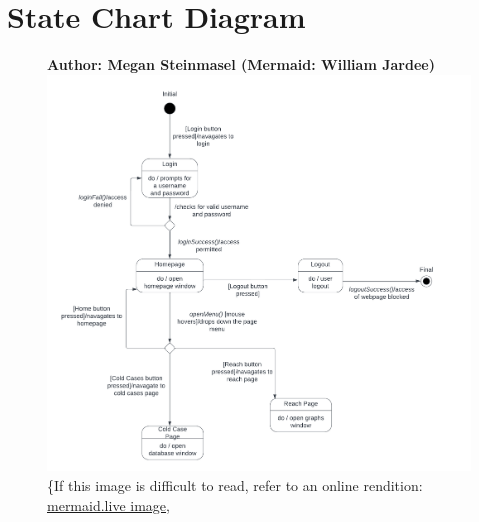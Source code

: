 \documentclass[11pt]{article}
\begin{document}
\section*{State Chart Diagram}

\begin{figure}[!ht]
\centering
\textbf{Author: Megan Steinmasel (Mermaid: William Jardee)}
	\includegraphics[width=.95\textwidth]{./State Chart/C.C. Statechart}\\
	\{If this image is difficult to read, refer to an online rendition: \href{https://mermaid.ink/img/pako:eNqlVU1vGjEQ_SuWT21EIEBLkr2RD_WSVmrph1TtZVgPu5a8NrK9IBTx3zu2ybJ85VJO3nl-b55nPOaVF0Ygz3ihwLknCaWFOteMfk_g4QEcspwPc86ur3eL2cZ5rKeilpplzKOlBXh0zEXgAtnQ6qbfv6KPgP2WrgFFfIveSlwRXZDInvysS6kRbRBItKQx3AlE8YwVFmNuIsOcQkmga7Hrfp-_lc-YQy0cU6bcJ9-5ax132X9w7qTHXy6S3_JT2ZbV--6vjqjr9MWa8FmADhaY1LlOMrEhHTevKczYtavM-kvI5z58zNjKSHEA_YS5wlPordBBMYD1Zvb9JaHb44yhuPt8MyLqkjVWHYesWR-HCqOauj0ExUGIH2Z96geF9AScxGn_Y9Qg5ITQIoccgQo9nlNLyAUaNY4UtcbCSxPhB2MUgj5Tls6VOq0MdVBDjcfxJRHXxu4TSr0CJcX0MeT7ZrxcbM6Y2g1Uyvi-q-5da21dNnbZWjRHu_3b9eh6aut4AXQerL9gN25IU_JiyjPkVIZY2EP04KCd0fnfc9pGTzWojZPujJ04yO_gNKRSnz8lQabxpw3jPV5TU0EKemej-5z7Cskuz2gpcAGN8jnPddjaLMND-EyX3VieLUA57HFovJltdNEG0q7de91GlQGBxHrlfrMMr3opnSfNwuiFLEOchpjClfdLlw0GAe6X0lfNvF-YeuCkqKiV1ep-MpiMJncwGuPkdgyfx2NRzIf3d4vRp-FC3N4MR8C32x5fgv5rDBnwtqH8GF1_3f2jpKTbf11N_Pk?type=png)](https://mermaid.live/edit#pako:eNqlVU1vGjEQ_SuWT21EIEBLkr2RD_WSVmrph1TtZVgPu5a8NrK9IBTx3zu2ybJ85VJO3nl-b55nPOaVF0Ygz3ihwLknCaWFOteMfk_g4QEcspwPc86ur3eL2cZ5rKeilpplzKOlBXh0zEXgAtnQ6qbfv6KPgP2WrgFFfIveSlwRXZDInvysS6kRbRBItKQx3AlE8YwVFmNuIsOcQkmga7Hrfp-_lc-YQy0cU6bcJ9-5ax132X9w7qTHXy6S3_JT2ZbV--6vjqjr9MWa8FmADhaY1LlOMrEhHTevKczYtavM-kvI5z58zNjKSHEA_YS5wlPordBBMYD1Zvb9JaHb44yhuPt8MyLqkjVWHYesWR-HCqOauj0ExUGIH2Z96geF9AScxGn_Y9Qg5ITQIoccgQo9nlNLyAUaNY4UtcbCSxPhB2MUgj5Tls6VOq0MdVBDjcfxJRHXxu4TSr0CJcX0MeT7ZrxcbM6Y2g1Uyvi-q-5da21dNnbZWjRHu_3b9eh6aut4AXQerL9gN25IU_JiyjPkVIZY2EP04KCd0fnfc9pGTzWojZPujJ04yO_gNKRSnz8lQabxpw3jPV5TU0EKemej-5z7Cskuz2gpcAGN8jnPddjaLMND-EyX3VieLUA57HFovJltdNEG0q7de91GlQGBxHrlfrMMr3opnSfNwuiFLEOchpjClfdLlw0GAe6X0lfNvF-YeuCkqKiV1ep-MpiMJncwGuPkdgyfx2NRzIf3d4vRp-FC3N4MR8C32x5fgv5rDBnwtqH8GF1_3f2jpKTbf11N_Pk}{mermaid.live image}, 

\end{figure}
\end{document}
